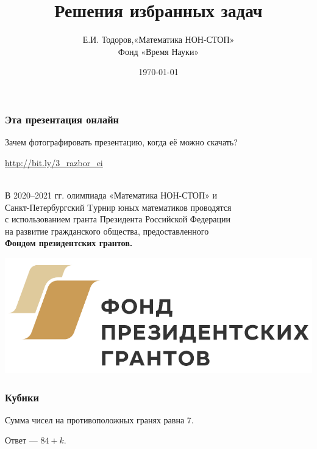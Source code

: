 \documentclass[aspectratio=1610,12pt,notheorems]{beamer}
\title[Solutions of MNS]
    {\bfseries Решения избранных задач}
\author[\ ]
	{Е.И. Тодоров,\quad «Математика НОН-СТОП»\\ \vspace{0.3cm}
		{\small Фонд «Время Науки»}}
\institute[\ ]{\ }
\date{\today}
\begin{document}
\frame{\titlepage}


\begin{frame} \frametitle{Эта презентация онлайн}
\begin{center}
\vspace{-10mm}
Зачем фотографировать презентацию, когда её можно скачать?\vspace{3mm}

		\vspace{3mm}
		
		\url{http://bit.ly/3_razbor_ei}
\end{center}
\end{frame}

\begin{frame}
	\ \\ [-0.5cm]
	\noindent В 2020–2021 гг. олимпиада «Математика НОН-СТОП»  и\\
	 Санкт-Петербургский Tурнир юных математиков проводятся \\
	с использованием гранта Президента Российской Федерации \\
	на развитие гражданского общества, предоставленного \\
	{\bfseries Фондом президентских грантов.}
	
	\vspace{0.45cm}
	\begin{center}
		\includegraphics[scale=0.6]{fpg/fpg}
	\end{center}
\end{frame}

\begin{frame} \frametitle{Кубики}



Сумма чисел на противоположных гранях равна 7. \medskip \pause

Ответ — $84 + k$.
\end{frame}
\end{document}
